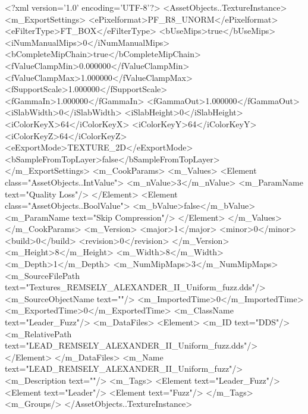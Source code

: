 <?xml version='1.0' encoding='UTF-8'?>
<AssetObjects..TextureInstance>
  <m_ExportSettings>
    <ePixelformat>PF_R8_UNORM</ePixelformat>
    <eFilterType>FT_BOX</eFilterType>
    <bUseMips>true</bUseMips>
    <iNumManualMips>0</iNumManualMips>
    <bCompleteMipChain>true</bCompleteMipChain>
    <fValueClampMin>0.000000</fValueClampMin>
    <fValueClampMax>1.000000</fValueClampMax>
    <fSupportScale>1.000000</fSupportScale>
    <fGammaIn>1.000000</fGammaIn>
    <fGammaOut>1.000000</fGammaOut>
    <iSlabWidth>0</iSlabWidth>
    <iSlabHeight>0</iSlabHeight>
    <iColorKeyX>64</iColorKeyX>
    <iColorKeyY>64</iColorKeyY>
    <iColorKeyZ>64</iColorKeyZ>
    <eExportMode>TEXTURE_2D</eExportMode>
    <bSampleFromTopLayer>false</bSampleFromTopLayer>
  </m_ExportSettings>
  <m_CookParams>
    <m_Values>
      <Element class="AssetObjects..IntValue">
        <m_nValue>3</m_nValue>
        <m_ParamName text="Quality Loss"/>
      </Element>
      <Element class="AssetObjects..BoolValue">
        <m_bValue>false</m_bValue>
        <m_ParamName text="Skip Compression"/>
      </Element>
    </m_Values>
  </m_CookParams>
  <m_Version>
    <major>1</major>
    <minor>0</minor>
    <build>0</build>
    <revision>0</revision>
  </m_Version>
  <m_Height>8</m_Height>
  <m_Width>8</m_Width>
  <m_Depth>1</m_Depth>
  <m_NumMipMaps>3</m_NumMipMaps>
  <m_SourceFilePath text="Textures\LEAD_REMSELY_ALEXANDER_II_Uniform_fuzz.dds"/>
  <m_SourceObjectName text=""/>
  <m_ImportedTime>0</m_ImportedTime>
  <m_ExportedTime>0</m_ExportedTime>
  <m_ClassName text="Leader_Fuzz"/>
  <m_DataFiles>
    <Element>
      <m_ID text="DDS"/>
      <m_RelativePath text="LEAD_REMSELY_ALEXANDER_II_Uniform_fuzz.dds"/>
    </Element>
  </m_DataFiles>
  <m_Name text="LEAD_REMSELY_ALEXANDER_II_Uniform_fuzz"/>
  <m_Description text=""/>
  <m_Tags>
    <Element text="Leader_Fuzz"/>
    <Element text="Leader"/>
    <Element text="Fuzz"/>
  </m_Tags>
  <m_Groups/>
</AssetObjects..TextureInstance>
